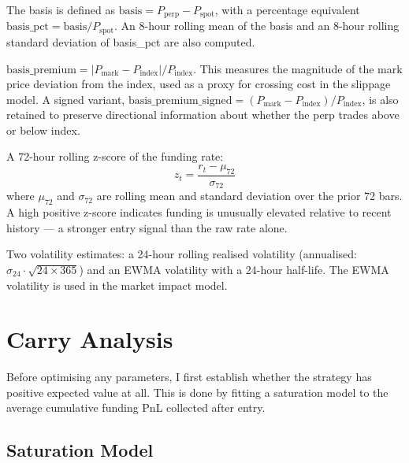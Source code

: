 \documentclass[11pt,a4paper]{article}
\begin{document}
\begin{description}[leftmargin=0em, itemsep=3pt]

\item[Basis and basis features]
The basis is defined as $\text{basis} = P_{\text{perp}} - P_{\text{spot}}$,
with a percentage equivalent $\text{basis\_pct} = \text{basis} / P_{\text{spot}}$.
An 8-hour rolling mean of the basis  and an 8-hour rolling
standard deviation of basis\_pct are also computed. 

    \item[Basis Premium]
    $\text{basis\_premium} = |P_{\text{mark}} - P_{\text{index}}| /
    P_{\text{index}}$. This measures the magnitude of the mark price deviation
    from the index, used as a proxy for crossing cost in the slippage model.
    A signed variant, $\text{basis\_premium\_signed} = (P_{\text{mark}} -
    P_{\text{index}}) / P_{\text{index}}$, is also retained to preserve
    directional information about whether the perp trades above or below index.

    \item[Funding features]
    A 72-hour rolling z-score of the funding rate:
    \[
        z_t = \frac{r_t - \mu_{72}}{\sigma_{72}}
    \]
    where $\mu_{72}$ and $\sigma_{72}$ are rolling mean and standard deviation
    over the prior 72 bars. A high positive z-score indicates funding is
    unusually elevated relative to recent history --- a stronger entry signal
    than the raw rate alone.

    \item[Volatility]
    Two volatility estimates: a 24-hour rolling realised volatility
    (annualised: $\hat{\sigma}_{24} \cdot \sqrt{24 \times 365}$) and an
    EWMA volatility with a 24-hour half-life. The EWMA volatility is used in the market impact model.
   
    
    \end{description}

\section{Carry Analysis}

Before optimising any parameters, I first establish whether the strategy has
positive expected value at all. This is done by fitting a saturation model
to the average cumulative funding PnL collected after entry.

\subsection{Saturation Model}
\end{document}
